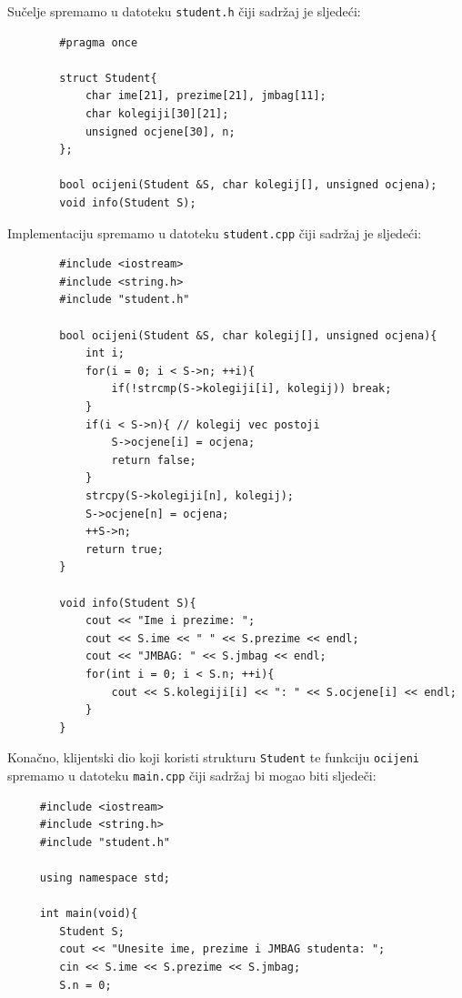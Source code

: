 \begin{rjesenje}
    Sučelje spremamo u datoteku \texttt{student.h} čiji sadržaj je sljedeći:
    \begin{verbatim}
        #pragma once

        struct Student{
            char ime[21], prezime[21], jmbag[11];
            char kolegiji[30][21];
            unsigned ocjene[30], n;
        };

        bool ocijeni(Student &S, char kolegij[], unsigned ocjena);
        void info(Student S);
    \end{verbatim}

    Implementaciju spremamo u datoteku \texttt{student.cpp} čiji sadržaj je sljedeći:
    \begin{verbatim}
        #include <iostream>
        #include <string.h>
        #include "student.h"

        bool ocijeni(Student &S, char kolegij[], unsigned ocjena){
            int i;
            for(i = 0; i < S->n; ++i){
                if(!strcmp(S->kolegiji[i], kolegij)) break;
            }
            if(i < S->n){ // kolegij vec postoji
                S->ocjene[i] = ocjena;
                return false;
            }
            strcpy(S->kolegiji[n], kolegij);
            S->ocjene[n] = ocjena;
            ++S->n;
            return true;
        }

        void info(Student S){
            cout << "Ime i prezime: ";
            cout << S.ime << " " << S.prezime << endl;
            cout << "JMBAG: " << S.jmbag << endl;
            for(int i = 0; i < S.n; ++i){
                cout << S.kolegiji[i] << ": " << S.ocjene[i] << endl;
            }
        }
    \end{verbatim}

    Konačno, klijentski dio koji koristi strukturu \texttt{Student} te funkciju \texttt{ocijeni} spremamo u datoteku \texttt{main.cpp} čiji sadržaj bi mogao biti sljedeči:
    \begin{verbatim}
     #include <iostream>
     #include <string.h>
     #include "student.h"
     
     using namespace std;

     int main(void){
        Student S;
        cout << "Unesite ime, prezime i JMBAG studenta: ";
        cin << S.ime << S.prezime << S.jmbag;
        S.n = 0;


\end{verbatim}
\end{rjesenje}

